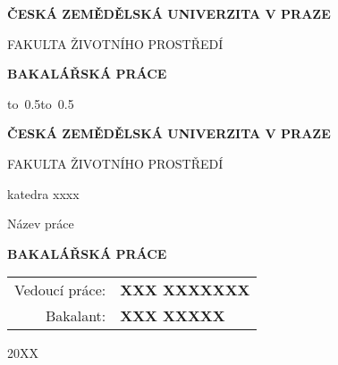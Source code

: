 \documentclass[12pt,a4paper]{report}
\begin{document}


\pagestyle{empty}
\begin{center}

\large

{\bf ČESKÁ ZEMĚDĚLSKÁ UNIVERZITA V PRAZE}

\medskip

FAKULTA ŽIVOTNÍHO PROSTŘEDÍ

\vfill

\vfill

{\bf \Large BAKALÁŘSKÁ PRÁCE}

\vfill

\vspace{10cm}

\vfill


\hbox{\hbox to 0.5\hbox to 0.5}

\end{center}
\pagestyle{empty}
\newpage
\begin{center}

\large

{ \bf ČESKÁ ZEMĚDĚLSKÁ UNIVERZITA V PRAZE}

\medskip

FAKULTA ŽIVOTNÍHO PROSTŘEDÍ

\medskip

{\sc \Large katedra xxxx}

\vfill

\vfill

{\LARGE Název práce}

\vspace{2mm}

{\bf \Large BAKALÁŘSKÁ PRÁCE}

\vspace{15mm}

\vfill

\vfill

\begin{tabular}{rl}

\noalign{\vspace{2mm}}
Vedoucí práce: & \bf XXX XXXXXXX \\
\noalign{\vspace{2mm}}
Bakalant: & \bf XXX XXXXX \\
\end{tabular}

\vfill

20XX

\end{center}
\newpage
\end{document}

